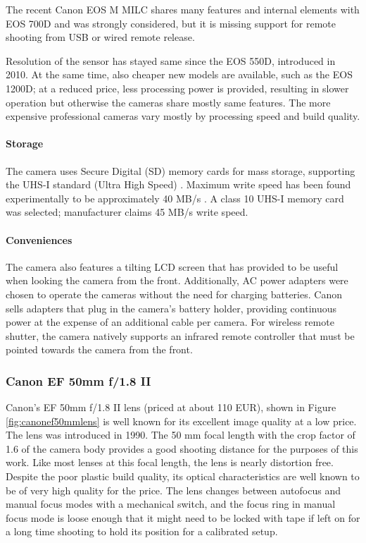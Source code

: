 The recent Canon EOS M MILC shares many features and internal elements with EOS 700D and was strongly considered, but it is missing support for remote shooting from USB or wired remote release.

Resolution of the sensor has stayed same since the EOS 550D, introduced in 2010.
At the same time, also cheaper new models are available, such as the EOS 1200D; at a reduced price, less processing power is provided, resulting in slower operation but otherwise the cameras share mostly same features.
The more expensive professional cameras vary mostly by processing speed and build quality.

\paragraph{Storage}
The camera uses Secure Digital (SD) memory cards for mass storage, supporting the UHS-I standard (Ultra High Speed) \cite{sdcardspeed}.
Maximum write speed has been found experimentally to be approximately 40 MB/s \cite{magiclanternforum}.
A class 10 UHS-I memory card was selected; manufacturer claims 45 MB/s write speed.

\paragraph{Conveniences}
The camera also features a tilting LCD screen that has provided to be useful when looking the camera from the front.
Additionally, AC power adapters were chosen to operate the cameras without the need for charging batteries.
Canon sells adapters that plug in the camera's battery holder, providing continuous power at the expense of an additional cable per camera.
For wireless remote shutter, the camera natively supports an infrared remote controller that must be pointed towards the camera from the front.


\subsubsection{Canon EF 50mm f/1.8 II}

Canon's EF 50mm f/1.8 II lens (priced at about 110 EUR), shown in Figure \ref{fig:canonef50mmlens} is well known for its excellent image quality at a low price.
The lens was introduced in 1990.
The 50 mm focal length with the crop factor of 1.6 of the camera body provides a good shooting distance for the purposes of this work.
Like most lenses at this focal length, the lens is nearly distortion free.
Despite the poor plastic build quality, its optical characteristics are well known to be of very high quality for the price.
The lens changes between autofocus and manual focus modes with a mechanical switch, and the focus ring in manual focus mode is loose enough that it might need to be locked with tape if left on for a long time shooting to hold its position for a calibrated setup.

